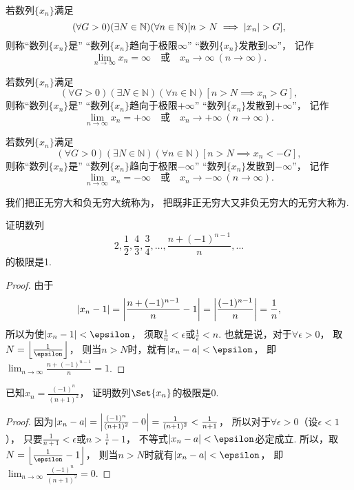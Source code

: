 \begin{definition}
若数列\(\{x_n\}\)满足\[
	(\forall G>0)
	(\exists N\in\mathbb{N})
	(\forall n\in\mathbb{N})
	[n > N \implies \abs{x_n} > G],
\]
则称“数列\(\{x_n\}\)是”
“数列\(\{x_n\}\)趋向于极限\(\infty\)”
“数列\(\{x_n\}\)发散到\(\infty\)”，
记作\[
	\lim_{n\to\infty} x_n = \infty
	\quad\text{或}\quad
	x_n\to\infty\ (n\to\infty).
\]

若数列\(\{x_n\}\)满足\[
	(\forall G>0)
	(\exists N\in\mathbb{N})
	(\forall n\in\mathbb{N})
	[n > N \implies x_n > G],
\]
则称“数列\(\{x_n\}\)是”
“数列\(\{x_n\}\)趋向于极限\(+\infty\)”
“数列\(\{x_n\}\)发散到\(+\infty\)”，
记作\[
	\lim_{n\to\infty} x_n = +\infty
	\quad\text{或}\quad
	x_n\to+\infty\ (n\to\infty).
\]

若数列\(\{x_n\}\)满足\[
	(\forall G>0)
	(\exists N\in\mathbb{N})
	(\forall n\in\mathbb{N})
	[n > N \implies x_n < -G],
\]
则称“数列\(\{x_n\}\)是”
“数列\(\{x_n\}\)趋向于极限\(-\infty\)”
“数列\(\{x_n\}\)发散到\(-\infty\)”，
记作\[
	\lim_{n\to\infty} x_n = -\infty
	\quad\text{或}\quad
	x_n\to-\infty\ (n\to\infty).
\]

我们把正无穷大和负无穷大统称为，
把既非正无穷大又非负无穷大的无穷大称为.
\end{definition}

\begin{example}
证明数列\[
	2,\frac{1}{2},\frac{4}{3},\frac{3}{4},\dotsc,\frac{n+(-1)^{n-1}}{n},\dotsc
\]的极限是1.
\begin{proof}
由于\[
	\abs{x_n - 1}
	= \abs{\frac{n+(-1)^{n-1}}{n}-1}
	= \abs{\frac{(-1)^{n-1}}{n}}
	= \frac{1}{n},
\]
所以为使\(\abs{x_n - 1} < \epsilon\)，
须取\(\frac{1}{n} < \epsilon\)或\(\frac{1}{\epsilon} < n\).
也就是说，对于\(\forall \epsilon > 0\)，
取\(N = \floor*{\frac{1}{\epsilon}}\)，
则当\(n > N\)时，就有\(\abs{x_n - a} < \epsilon\)，
即\(\lim_{n\to\infty}\frac{n+(-1)^{n-1}}{n}=1\).
\end{proof}
\end{example}

\begin{example}
已知\(x_n = \frac{(-1)^n}{(n+1)^2}\)，
证明数列\(\Set{x_n}\)的极限是\(0\).
\begin{proof}
因为\(\abs{x_n - a}
= \abs{\frac{(-1)^n}{(n+1)^2}-0}
= \frac{1}{(n+1)^2}
< \frac{1}{n+1}\)，
所以对于\(\forall\epsilon>0\)（设\(\epsilon<1\)），
只要\(\frac{1}{n+1}<\epsilon\)或\(n>\frac{1}{\epsilon}-1\)，
不等式\(\abs{x_n-a}<\epsilon\)必定成立.
所以，取\(N=\floor*{\frac{1}{\epsilon}-1}\)，
则当\(n>N\)时就有\(\abs{x_n - a}<\epsilon\)，
即\(\lim_{n\to\infty}\frac{(-1)^n}{(n+1)^2}=0\).
\end{proof}
\end{example}

